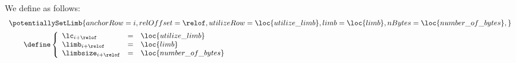 We define \potentiallySetLimbName{} as follows:
\[
	\begin{array}{l}
		\potentiallySetLimb {
			anchorRow  = i                       ,
			relOffset  = \relof                  ,
			utilizeRow = \loc{utilize\_limb}     ,
			limb       = \loc{limb}              ,
			nBytes     = \loc{number\_of\_bytes} ,
		}
		\vspace{2mm} \\
		\qquad \define
		\left\{ \begin{array}{lcl}
			\lc       _{i + \relof} & = & \loc{utilize\_limb}     \\
			\limb     _{i + \relof} & = & \loc{limb}              \\
			\limbsize _{i + \relof} & = & \loc{number\_of\_bytes} \\
		\end{array} \right.
	\end{array}
\]
